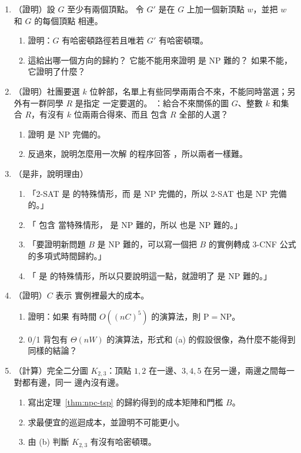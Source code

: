 \begin{enumerate}
\item （證明）設 $G$ 至少有兩個頂點。 令 $G'$ 是在 $G$ 上加一個新頂點 $w$，並把 $w$ 和 $G$ 的每個頂點
相連。
\begin{enumerate}
\item 證明：$G$ 有哈密頓路徑若且唯若 $G'$ 有哈密頓環。
\item 這給出哪一個方向的歸約？ 它能不能用來證明  是 NP 難的？ 如果不能，它證明了什麼？
\end{enumerate}

\item （證明）社團要選 $k$ 位幹部，名單上有些同學兩兩合不來，不能同時當選；另外有一群同學 $R$ 是指定
一定要選的。 ：給合不來關係的圖 $G$、整數 $k$ 和集合 $R$，有沒有 $k$ 位兩兩合得來、而且
包含 $R$ 全部的人選？
\begin{enumerate}
\item 證明  是 NP 完備的。
\item 反過來，說明怎麼用一次解  的程序回答 ，所以兩者一樣難。
\end{enumerate}

\item （是非，說明理由）
\begin{enumerate}
\item 「2-SAT 是  的特殊情形，而  是 NP 完備的，所以 2-SAT 也是 NP 完備的。」
\item 「 包含  當特殊情形， 是 NP 難的，所以  也是 NP 難的。」
\item 「要證明新問題 $B$ 是 NP 難的，可以寫一個把 $B$ 的實例轉成 3-CNF 公式的多項式時間歸約。」
\item 「 是  的特殊情形，所以只要說明這一點，就證明了  是 NP 難的。」
\end{enumerate}

\item （證明）$C$ 表示  實例裡最大的成本。
\begin{enumerate}
\item 證明：如果  有時間 $O((nC)^5)$ 的演算法，則 $\mathrm{P} = \mathrm{NP}$。
\item 0/1 背包有 $\Theta(nW)$ 的演算法，形式和 (a) 的假設很像，為什麼不能得到同樣的結論？
\end{enumerate}

\item （計算）完全二分圖 $K_{2,3}$：頂點 $1, 2$ 在一邊、$3, 4, 5$ 在另一邊，兩邊之間每一對都有邊，同一
邊內沒有邊。
\begin{enumerate}
\item 寫出定理~\ref{thm:npc-tsp} 的歸約得到的成本矩陣和門檻 $B$。
\item 求最便宜的巡迴成本，並證明不可能更小。
\item 由 (b) 判斷 $K_{2,3}$ 有沒有哈密頓環。
\end{enumerate}
\end{enumerate}


